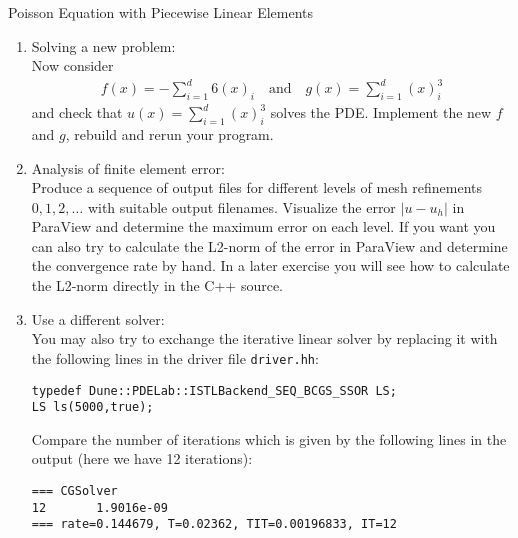 \documentclass[12pt,a4paper]{article}
\begin{document}
\begin{Exercise}{Poisson Equation with Piecewise Linear Elements}
\begin{enumerate}
\item {\sc Solving a new problem}:\\
  Now consider
  \begin{align}
    f(x) =  -\sum_{i=1}^d 6(x)_i \quad\text{and}\quad  g(x) = \sum_{i=1}^d (x)_i^3
  \end{align}
  and check that $u(x)=\sum_{i=1}^d (x)_i^3$ solves the PDE. Implement
  the new $f$ and $g$, rebuild and rerun your program.

\item {\sc Analysis of finite element error}:\\
  Produce a sequence of output files for different levels of mesh
  refinements $0, 1, 2, \ldots$ with suitable output
  filenames. Visualize the error $|u-u_h|$ in Para\-View and determine
  the maximum error on each level.  If you want you can also try to
  calculate the L2-norm of the error in ParaView and determine the
  convergence rate by hand. In a later exercise you will see how to
  calculate the L2-norm directly in the C++ source.

\item {\sc Use a different solver}:\\
  You may also try to exchange the iterative linear solver by
  replacing it with the following lines in the driver file
  \lstinline{driver.hh}:
  \begin{lstlisting}
typedef Dune::PDELab::ISTLBackend_SEQ_BCGS_SSOR LS;
LS ls(5000,true);
  \end{lstlisting}
  Compare the number of iterations which is given by the following lines
  in the output (here we have 12 iterations):
  \begin{lstlisting}
=== CGSolver
12       1.9016e-09
=== rate=0.144679, T=0.02362, TIT=0.00196833, IT=12
  \end{lstlisting}
\end{enumerate}
\end{Exercise}
\end{document}
